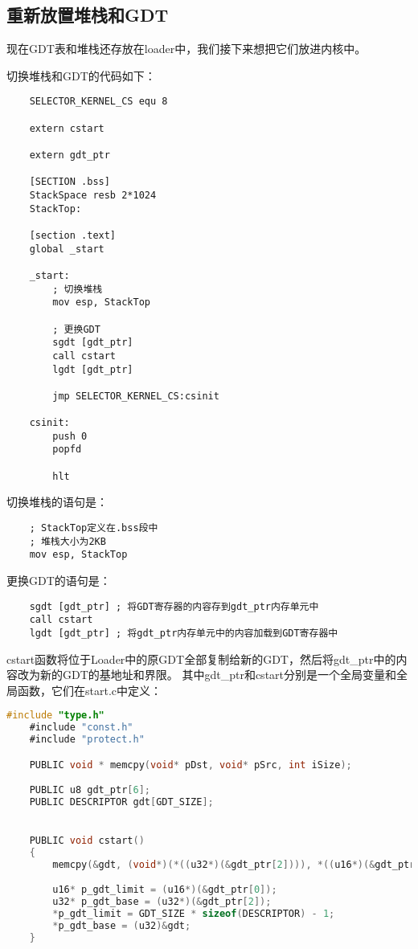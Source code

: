 \documentclass[a4paper,left=2.5cm,right=2.5cm,11pt]{article}
\begin{document}
\subsection{重新放置堆栈和GDT}
	现在GDT表和堆栈还存放在loader中，我们接下来想把它们放进内核中。\par
	切换堆栈和GDT的代码如下：
	\begin{lstlisting}
	SELECTOR_KERNEL_CS equ 8

	extern cstart

	extern gdt_ptr

	[SECTION .bss]
	StackSpace resb 2*1024
	StackTop:

	[section .text]
	global _start

	_start:
		; 切换堆栈
		mov esp, StackTop

		; 更换GDT
		sgdt [gdt_ptr]
		call cstart
		lgdt [gdt_ptr]

		jmp SELECTOR_KERNEL_CS:csinit

	csinit:
		push 0
		popfd

		hlt
	\end{lstlisting}

	切换堆栈的语句是：
	\begin{lstlisting}
	; StackTop定义在.bss段中
	; 堆栈大小为2KB
	mov esp, StackTop
	\end{lstlisting}

	更换GDT的语句是：
	\begin{lstlisting}
	sgdt [gdt_ptr] ; 将GDT寄存器的内容存到gdt_ptr内存单元中
	call cstart
	lgdt [gdt_ptr] ; 将gdt_ptr内存单元中的内容加载到GDT寄存器中
	\end{lstlisting}
	
	cstart函数将位于Loader中的原GDT全部复制给新的GDT，然后将gdt\_ptr中的内容改为新的GDT的基地址和界限。
	其中gdt\_ptr和cstart分别是一个全局变量和全局函数，它们在start.c中定义：
	\begin{lstlisting}[language = C]
	#include "type.h"
	#include "const.h"
	#include "protect.h"

	PUBLIC void * memcpy(void* pDst, void* pSrc, int iSize);

	PUBLIC u8 gdt_ptr[6];
	PUBLIC DESCRIPTOR gdt[GDT_SIZE];


	PUBLIC void cstart()
	{
		memcpy(&gdt, (void*)(*((u32*)(&gdt_ptr[2]))), *((u16*)(&gdt_ptr[0]))+1);

		u16* p_gdt_limit = (u16*)(&gdt_ptr[0]);
		u32* p_gdt_base = (u32*)(&gdt_ptr[2]);
		*p_gdt_limit = GDT_SIZE * sizeof(DESCRIPTOR) - 1;
		*p_gdt_base = (u32)&gdt;
	}
	\end{lstlisting}
\end{document}
